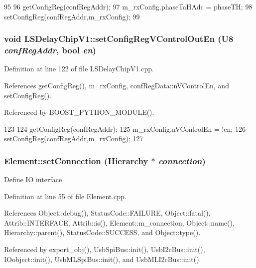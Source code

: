 \begin{DoxyCode}
95 {
96     getConfigReg(confRegAddr);
97     m_rxConfig.phaseTaHAdc = phaseTH;
98     setConfigReg(confRegAddr,m_rxConfig);
99 }
\end{DoxyCode}
\hypertarget{classLSDelayChipV1_afd8a57dda2cd6a62607cbfc9808c3220}{
\subsubsection[{setConfigRegVControlOutEn}]{\setlength{\rightskip}{0pt plus 5cm}void LSDelayChipV1::setConfigRegVControlOutEn ({\bf U8} {\em confRegAddr}, \/  bool {\em en})}}
\label{classLSDelayChipV1_afd8a57dda2cd6a62607cbfc9808c3220}


Definition at line 122 of file LSDelayChipV1.cpp.

References getConfigReg(), m\_\-rxConfig, confRegData::nVControlEn, and setConfigReg().

Referenced by BOOST\_\-PYTHON\_\-MODULE().


\begin{DoxyCode}
123 {
124     getConfigReg(confRegAddr);
125     m_rxConfig.nVControlEn = !en;
126     setConfigReg(confRegAddr,m_rxConfig);
127 }
\end{DoxyCode}
\hypertarget{classElement_ab476b4b1df5954141ceb14f072433b89}{
\subsubsection[{setConnection}]{ Element::setConnection ({\bf Hierarchy} $\ast$ {\em connection})}}
\label{classElement_ab476b4b1df5954141ceb14f072433b89}
Define IO interface 

Definition at line 55 of file Element.cpp.

References Object::debug(), StatusCode::FAILURE, Object::fatal(), Attrib::INTERFACE, Attrib::is(), Element::m\_\-connection, Object::name(), Hierarchy::parent(), StatusCode::SUCCESS, and Object::type().

Referenced by export\_\-obj(), UsbSpiBus::init(), UsbI2cBus::init(), IOobject::init(), UsbMLSpiBus::init(), and UsbMLI2cBus::init().


